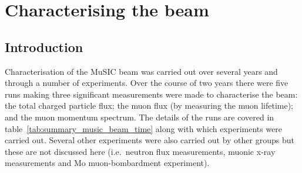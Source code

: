 \chapter{Characterising the beam} %
\label{prt:characterising_the_beam}
\section{Introduction} %
\label{cha:introduction}
Characterisation of the MuSIC beam was carried out over several years and through a number of experiments. Over the course of two years there were five runs making three significant measurements were made to characterise the beam: the total charged particle flux; the muon flux (by measuring the muon lifetime); and the muon momentum spectrum. The details of the runs are covered in table~\ref{tab:summary_music_beam_time} along with which experiments were carried out. Several other experiments were also carried out by other groups but these are not discussed here (i.e.\ neutron flux measurements, muonic x-ray measurements and Mo muon-bombardment experiment).
